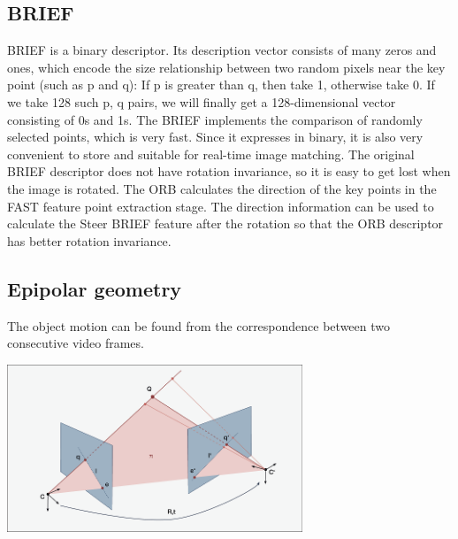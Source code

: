 \subsection{BRIEF}

BRIEF is a binary descriptor. Its description vector consists of many zeros and ones, which encode the size relationship between two random pixels near the key point (such as p and q): If p is greater than q, then take 1, otherwise take 0. If we take 128 such p, q pairs, we will finally get a 128-dimensional vector consisting of 0s and 1s. The BRIEF implements the comparison of randomly selected points, which is very fast. Since it expresses in binary, it is also very convenient to store and suitable for real-time image matching. The original BRIEF descriptor does not have rotation invariance, so it is easy to get lost when the image is rotated. The ORB calculates the direction of the key points in the FAST feature point extraction stage. The direction information can be used to calculate the Steer BRIEF feature after the rotation so that the ORB descriptor has better rotation invariance. 


\subsection{Epipolar geometry}

The object motion can be found from the correspondence between two consecutive video frames. 
\begin{center}
    \includegraphics[height=5cm]{nc.png}\\[1cm]
\end{center}

